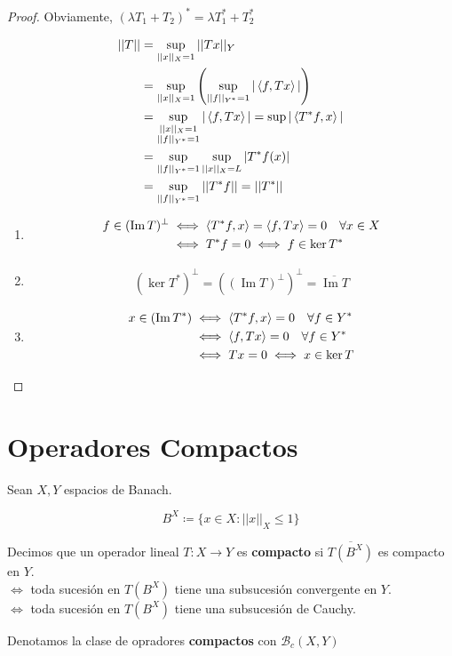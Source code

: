 \begin{proof}
   Obviamente, $(\lambda T_1+T_2)^*=\lambda T_1^*+T_2^*$

   \begin{align*}
       ||T||&=\sup_{||x||_X=1}||Tx||_Y\\
       &=\sup_{||x||_X=1}\left(\sup_{||f||_{Y^*}=1}|\left\langle f,Tx\right\rangle|\right)\\
       &=\sup_{\substack{||x||_X=1\\||f||_{Y^*}=1}}|\left\langle f,Tx\right\rangle|=\sup|\left\langle T^*f,x\right\rangle|\\
       &=\sup_{||f||_{Y^*}=1}\sup_{||x||_X=L}|T^*f(x)|\\
       &=\sup_{||f||_{Y^*}=1}||T^*f||=||T^*||
   \end{align*}

   \begin{enumerate}[label=(\alph*)]
       \item \begin{align*}
           f\in (\operatorname{Im}T)^\perp&\iff \left\langle T^*f,x\right\rangle=\left\langle f,Tx\right\rangle=0\quad\forall x\in X\\
           &\iff T^*f=0\iff f\in \ker T^*
       \end{align*}

       \item \begin{align*}
           (\ker T^*)^\perp=((\operatorname{Im}T)^\perp)^\perp=\overline{\operatorname{Im}T}
       \end{align*}

       \item \begin{align*}
           x\in (\operatorname{Im}T^*)&\iff \left\langle T^*f,x\right\rangle=0\quad\forall f\in Y^*\\
           &\iff \left\langle f,Tx\right\rangle=0\quad\forall f\in Y^*\\
           &\iff Tx=0\iff x\in \ker T 
       \end{align*}
   \end{enumerate}
\end{proof}

\section{Operadores Compactos}

\begin{fdefinition}
   Sean $X,Y$ espacios de Banach.

   \[B^X\coloneqq \{x\in X:||x||_X\leq 1\}\]

   Decimos que un operador lineal $T:X\to Y$ es \textbf{compacto} si $\overline{T(B^X)}$ es compacto en $Y$.\\
   $\iff$ toda sucesión en ${T(B^X)}$ tiene una subsucesión convergente en $Y$.\\
   $\iff$ toda sucesión en $T(B^X)$ tiene una subsucesión de Cauchy.

   Denotamos la clase de opradores \textbf{compactos} con $\mathcal{B}_c(X,Y)$
\end{fdefinition}

